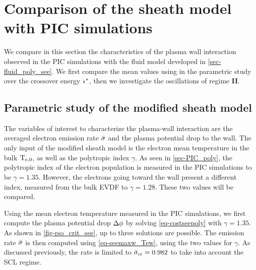 

\section{Comparison of the sheath model with PIC simulations} \label{subsec-picandmodel}


  We compare in this section the characteristics of the plasma wall interaction observed in the \ac{PIC} simulations with the fluid model developed in \cref{sec-fluid_poly_see}.
  We first compare the mean values using in the parametric study over the crossover energy $\epsilon^{*}$, then we investigate the oscillations of regime {\bf II}.

  \subsection{Parametric study of the modified sheath model} \label{subsec-param_sheath_see}

    The variables of interest to characterize the plasma-wall interaction are the averaged electron emission rate $ \bar{\sigma }$ and the plasma potential drop to the wall.
    The only input of the modified sheath model is the electron mean temperature in the bulk $\mathrm{T_{e, 0}}$, as well as the polytropic index $\gamma$.
    As seen in \cref{sec-PIC_poly}, the polytropic index of the electron population is measured in the \ac{PIC} simulations to be $\gamma=1.35$.
    However, the electrons going toward the wall present a different index, measured from the bulk \ac{EVDF} to $\gamma=1.28$.
    These two values will be compared.

    Using the mean electron temperature measured in the \ac{PIC} simulations, we first compute the plasma potential drop $\Delta \phi$ by solving \cref{eq-costseepoly} with $\gamma=1.35$.
    As shown in \cref{fig-rso_crit_see}, up to three solutions are possible.
    The emission rate $ \bar{\sigma }$ is then computed using \cref{eq-seemaxw_Tew}, using the two values for $\gamma$.
    As discussed previously, the rate is limited to $ \bar{\sigma }_{\rm cr}=0.982$ to take into account the \ac{SCL} regime.

